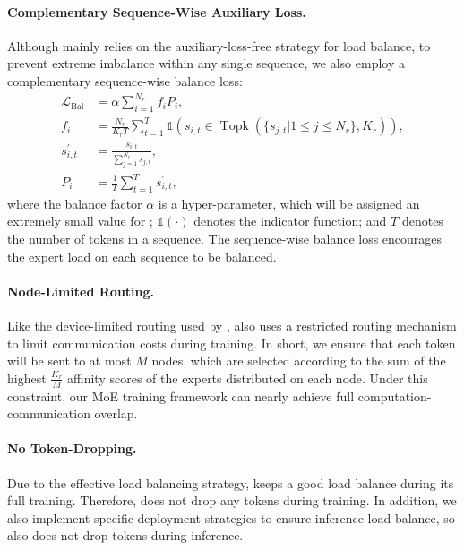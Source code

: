 \paragraph{Complementary Sequence-Wise Auxiliary Loss.}
Although \dsviii{} mainly relies on the auxiliary-loss-free strategy for load balance, to prevent extreme imbalance within any single sequence, we also employ a complementary sequence-wise balance loss:
\begin{align}
    \mathcal{L}_{\mathrm{Bal}} & = \alpha \sum_{i=1}^{N_r}{f_i P_i}, \\
    f_i &= \frac{N_r}{K_r T} \sum_{t=1}^{T} \mathds{1} \left( s_{i,t} \in \operatorname{Topk} ( \{ s_{j, t} | 1 \leq j \leq N_r \}, K_{r} ) \right), \\
    s^{\prime}_{i,t} & = \frac{s_{i,t}}{\sum_{j=1}^{N_r} s_{j,t}}, \\
    P_i & = \frac{1}{T} \sum_{t=1}^{T}{s^{\prime}_{i,t}},
\end{align}
where the balance factor $\alpha$ is a hyper-parameter, which will be assigned an extremely small value for \dsviii{}; 
$\mathds{1}(\cdot)$ denotes the indicator function; 
and $T$ denotes the number of tokens in a sequence. 
The sequence-wise balance loss encourages the expert load on each sequence to be balanced. 

\paragraph{Node-Limited Routing.}
Like the device-limited routing used by \dsvii{}, \dsviii{} also uses a restricted routing mechanism to limit communication costs during training. 
In short, we ensure that each token will be sent to at most $M$ nodes, which are selected according to the sum of the highest $\frac{K_r}{M}$ affinity scores of the experts distributed on each node.
Under this constraint, our MoE training framework can nearly achieve full computation-communication overlap. 

\paragraph{No Token-Dropping.}
Due to the effective load balancing strategy, \dsviii{} keeps a good load balance during its full training. 
Therefore, \dsviii{} does not drop any tokens during training. 
In addition, we also implement specific deployment strategies to ensure inference load balance, so \dsviii{} also does not drop tokens during inference. 

